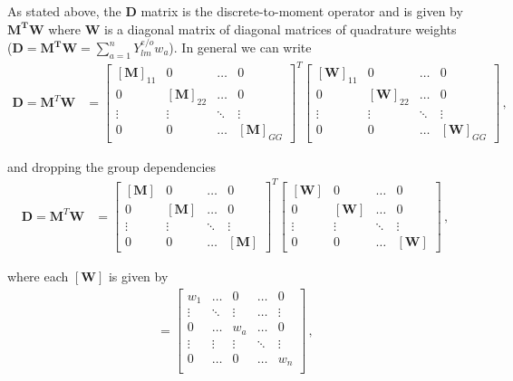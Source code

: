 \documentclass[10pt]{article}
\begin{document}
As stated above, the $\textbf{D}$ matrix is the discrete-to-moment operator and is given by $\textbf{M}^\textbf{T}\textbf{W}$ where $\textbf{W}$ is a diagonal matrix of diagonal matrices of quadrature weights ($\textbf{D}=\textbf{M}^\textbf{T}\textbf{W}=\sum_{a=1}^n Y_{lm}^{e/o} w_a$). In general we can write
%
\begin{align*}
\textbf{D} = \textbf{M}^T\textbf{W} &=
\begin{bmatrix}
    [\textbf{M}]_{11} & 0 & \dots & 0  \\
    0 & [\textbf{M}]_{22} & \dots & 0  \\
    \vdots & \vdots & \ddots & \vdots \\
    0 & 0 & \dots & [\textbf{M}]_{GG}
\end{bmatrix} ^ T
\begin{bmatrix}
    [\textbf{W}]_{11} & 0 & \dots & 0  \\
    0 & [\textbf{W}]_{22} & \dots & 0  \\
    \vdots & \vdots & \ddots & \vdots \\
    0 & 0 & \dots & [\textbf{W}]_{GG}
\end{bmatrix}\,,
\end{align*}

and dropping the group dependencies 
%
\begin{align*}
\textbf{D} = \textbf{M}^T\textbf{W} &=
\begin{bmatrix}
    [\textbf{M}] & 0 & \dots & 0  \\
    0 & [\textbf{M}] & \dots & 0  \\
    \vdots & \vdots & \ddots & \vdots \\
    0 & 0 & \dots & [\textbf{M}]
\end{bmatrix} ^ T
\begin{bmatrix}
    [\textbf{W}] & 0 & \dots & 0  \\
    0 & [\textbf{W}] & \dots & 0  \\
    \vdots & \vdots & \ddots & \vdots \\
    0 & 0 & \dots & [\textbf{W}]
\end{bmatrix}\,,
\end{align*}

where each $[\textbf{W}]$ is given by
%
\begin{align*}
[\textbf{W}] = 
\begin{bmatrix}
    w_1 & \dots & 0 & \dots & 0  \\
    \vdots & \ddots & \vdots & \dots & \vdots   \\
    0 & \dots & w_a & \dots & 0 \\
     \vdots & \vdots & \vdots & \ddots & \vdots  \\
         0 & \dots & 0 &  \dots & w_n \\
\end{bmatrix}\,,
\end{align*}
\end{document}
